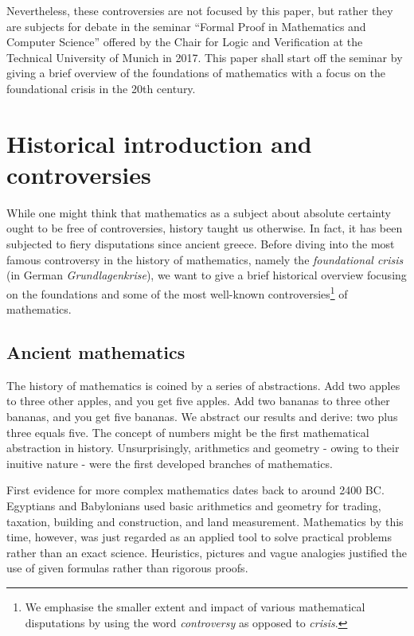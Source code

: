 \documentclass[hidelinks]{article}
\theoremstyle{plain}
\theoremstyle{definition}
\theoremstyle{rem}
\begin{document}
Nevertheless, these controversies are not focused by this paper, but rather they are subjects for debate in the seminar ``Formal Proof in Mathematics and Computer Science'' offered by the Chair for Logic and Verification at the Technical University of Munich in 2017. This paper shall start off the seminar by giving a brief overview of the foundations of mathematics with a focus on the foundational crisis in the 20th century.
\newpage

\tableofcontents 
\newpage

\section{Historical introduction and controversies}
While one might think that mathematics as a subject about absolute certainty ought to be free of controversies, history taught us otherwise. In fact, it has been subjected to fiery disputations since ancient greece. Before diving into the most famous controversy in the history of mathematics, namely the \textit{foundational crisis} (in German \textit{Grundlagenkrise}), we want to give a brief historical overview focusing on the foundations and some of the most well-known controversies\footnote{We emphasise the smaller extent and impact of various mathematical disputations by using the word \textit{controversy} as opposed to \textit{crisis}.} of mathematics.

\subsection{Ancient mathematics}

The history of mathematics is coined by a series of abstractions.
Add two apples to three other apples, and you get five apples. Add two bananas to three other bananas, and you get five bananas. We abstract our results and derive: two plus three equals five. The concept of numbers might be the first mathematical abstraction in history. Unsurprisingly, arithmetics and geometry - owing to their inuitive nature - were the first developed branches of mathematics.

First evidence for more complex mathematics dates back to around 2400 BC\@. Egyptians and Babylonians used basic arithmetics and geometry for trading, taxation, building and construction, and land measurement. Mathematics by this time, however, was just regarded as an applied tool to solve practical problems rather than an exact science. Heuristics, pictures and vague analogies justified the use of given formulas rather than rigorous proofs.
\end{document}
